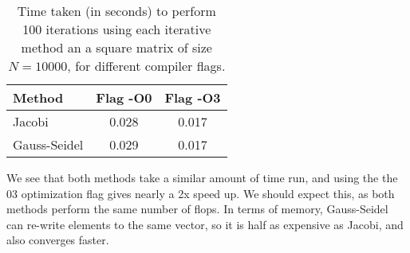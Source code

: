\documentclass[11pt]{article}
\begin{document}
\begin{enumerate}
\begin{table}[h!] 
	\centering
	\begin{tabular}{l | c c }
		Method & Flag -O0 & Flag -O3\\
		\hline
		Jacobi & 0.028 & 0.017\\
		Gauss-Seidel & 0.029 & 0.017
	\end{tabular}
	\caption{Time taken (in seconds) to perform 100 iterations using each iterative method an a square matrix of size $N=10000$, for different compiler flags.}
\end{table}

We see that both methods take a similar amount of time run, and using the the 03 optimization flag gives nearly a 2x speed up. We should expect this, as both methods perform the same number of flops. In terms of memory, Gauss-Seidel can re-write elements to the same vector, so it is half as expensive as Jacobi, and also converges faster. 






















\end{enumerate}
\end{document}
